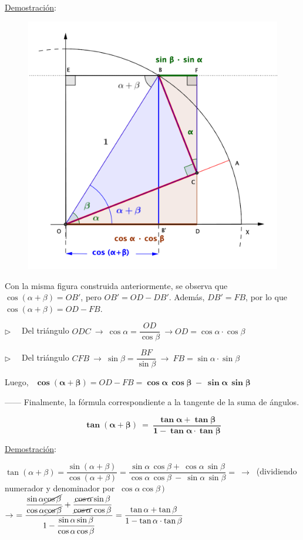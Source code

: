 \underline{Demostración}:

\begin{figure}[H]
	\centering
	\includegraphics[width=.5\textwidth]{img-ft/ft03.png}
	\end{figure}

\vspace{-10mm}
Con la misma figura construida anteriormente, se observa que $\cos(\alpha+\beta)=OB'$, pero $OB'=OD-DB'$. Además, $DB'=FB$, por lo que $\cos(\alpha+\beta)=OD-FB$.

$\triangleright \quad$ Del triángulo $ODC \ \to \ \cos \alpha=\dfrac{OD}{\cos \beta} \ \to OD=\cos \alpha \cdot \cos \beta$

$\triangleright \quad$ Del triángulo $CFB \ \to \ \sin \beta=\dfrac{BF}{\sin \beta} \ \to \ FB=\sin \alpha \cdot \sin \beta$

Luego, $\ \ \boldsymbol{ \cos(\alpha+\beta) }=OD-FB=\boldsymbol{ \cos \alpha \, \cos \beta \ - \ \sin \alpha \, \sin \beta }$ \QED



\vspace{5mm} ------ Finalmente, la fórmula correspondiente a la tangente de la suma de ángulos.

\vspace{5mm}
\begin{theorem}

$$\boldsymbol{ \tan(\alpha+\beta) \ = \ \dfrac{\tan \alpha + \tan \beta}{1-\tan \alpha \cdot \tan \beta} }$$	
\end{theorem}

\underline{Demostración}:

$\tan(\alpha+\beta)=\dfrac{\sin (\alpha+\beta)}{\cos (\alpha+\beta)}= \dfrac{\sin \alpha \, \cos \beta + \ \cos \alpha \, \sin \beta}{\cos \alpha \, \cos \beta \ - \ \sin \alpha \, \sin \beta }= \ \to \ $ 
\textcolor{gris}{ (dividiendo numerador y denominador por } $\ \cos \alpha \cos \beta\, ) \  $
$\to \ = \dfrac{\dfrac{\sin \alpha \cancel{\cos \beta}}{\cos \alpha \cancel{\cos \beta}}+ \dfrac{\cancel{\cos \alpha} \sin \beta}{\cancel{\cos \alpha} \, \cos \beta} }{1-\dfrac{\sin \alpha \sin \beta}{\cos \alpha \cos \beta}}=\dfrac{\tan \alpha + \tan \beta}{1-\tan \alpha \cdot \tan \beta}$ \QED

